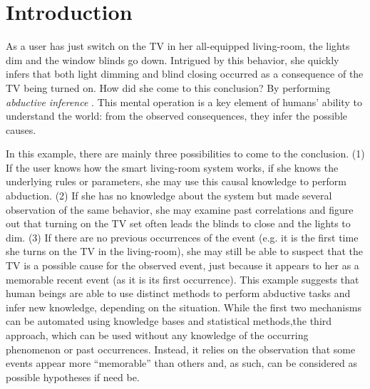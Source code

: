 \documentclass[entropy,article,submit,moreauthors,pdftex]{Definitions/mdpi}
\begin{document}

\section{Introduction}


As a user has just switch on the TV in her all-equipped living-room, the
lights dim and the window blinds go down. Intrigued by this behavior, she
quickly infers that both light dimming and blind closing occurred as a
consequence of the TV being turned on. How did she come to this conclusion?
By performing \emph{abductive inference} \cite{magnani_abduction_2011}. This mental operation
is a key element of humans' ability to understand the world: from the
observed consequences, they infer the possible causes.

In this example, there are mainly three possibilities to come to the
conclusion. (1) If the user knows how the smart living-room system works, if she
knows the underlying rules or parameters, she may use this causal
knowledge to perform abduction. (2) If she has no knowledge
about the system but made several observation of the same behavior, she may examine past
correlations and figure out that turning on the TV set often leads the blinds to
close and the lights to dim. (3) If there are no previous occurrences of the event (e.g. it is the first time she turns on the TV
in the living-room), she may still be able to
suspect that the TV is a possible cause for the observed event, just because it appears to her as a memorable recent event (as it is its first occurrence). This example
suggests that human beings are able to use distinct methods to perform abductive tasks
and infer new knowledge, depending on the situation. While the first two mechanisms can be
automated using knowledge bases and statistical methods,the third approach, which can be used without any knowledge of the occurring phenomenon or past occurrences. Instead, it relies on the observation that some events appear more ``memorable'' than others and, as such, can be considered as possible hypotheses if need be.
\end{document}

